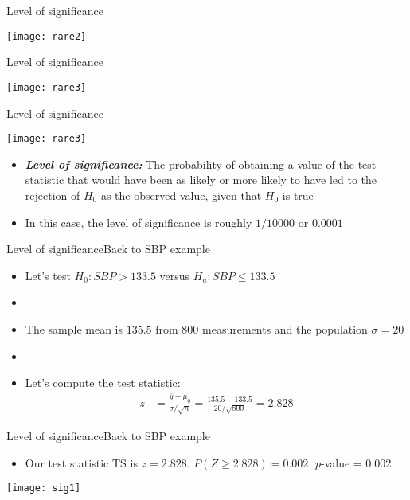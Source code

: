 \documentclass[xcolor=dvipsnames]{beamer}
\begin{document}
\begin{frame}{Level of significance}
\begin{center}
	\texttt{[image: rare2]}
\end{center}
\end{frame}

\begin{frame}{Level of significance}
\begin{center}
	\texttt{[image: rare3]}
\end{center}
\end{frame}

\begin{frame}{Level of significance}
\begin{center}
	\texttt{[image: rare3]}
\end{center}
\vspace{-10pt}
\begin{itemize}
	\item \textbf{\emph{Level of significance:}} The probability of obtaining a value of the test statistic that would have been as likely or more likely to have led to the rejection of $H_0$ as the observed value, given that $H_0$ is true  \pause
	\item In this case, the level of significance is roughly $1/10000$ or $0.0001$
\end{itemize}
\end{frame}

\begin{frame}{Level of significance}{Back to SBP example}
\begin{itemize}
	\item Let's test $H_0: SBP > 133.5$ versus $H_a: SBP \leq 133.5$  \pause
	\item[]
	\item The sample mean is $135.5$ from 800 measurements and the population $\sigma = 20$  \pause
	\item[]
	\item Let's compute the test statistic:
	\begin{align*}
	z &= \frac{\bar{y} - \mu_0}{\sigma / \sqrt{n}} = \frac{135.5 - 133.5}{20 / \sqrt{800}} = 2.828
	\end{align*}
\end{itemize}
\end{frame}

\begin{frame}{Level of significance}{Back to SBP example}
\begin{itemize}
	\item Our test statistic TS is $z = 2.828$. $P(Z \geq 2.828) = 0.002$. $p$-value = 0.002  \pause
\end{itemize}
\vspace{-10pt}
\begin{center}
	\texttt{[image: sig1]}
\end{center}
\end{frame}
\end{document}

